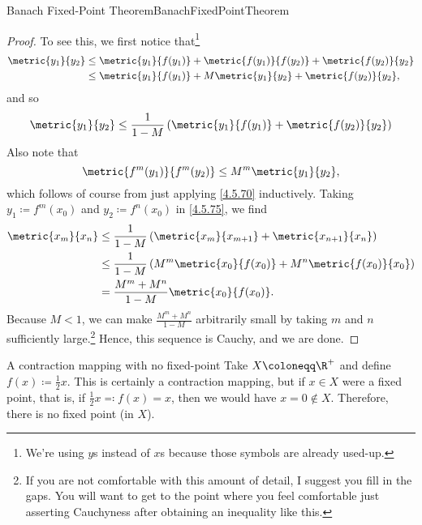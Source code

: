 \begin{thm}{Banach Fixed-Point Theorem}{BanachFixedPointTheorem}
\begin{proof}
To see this, we first notice that\footnote{We're using $y$s instead of $x$s because those symbols are already used-up.}
\begin{equation}
\begin{split}
\metric{y_1}{y_2} & \leq \metric{y_1}{f(y_1)}+\metric{f(y_1)}{f(y_2)}+\metric{f(y_2)}{y_2} \\
& \leq \metric{y_1}{f(y_1)}+M\metric{y_1}{y_2}+\metric{f(y_2)}{y_2},
\end{split}
\end{equation}
and so
\begin{equation}\label{4.5.75}
\metric{y_1}{y_2}\leq \frac{1}{1-M}\left( \metric{y_1}{f(y_1)}+\metric{f(y_2)}{y_2}\right) 
\end{equation}
Also note that
\begin{equation}
\metric{f^m(y_1)}{f^m(y_2)}\leq M^m\metric{y_1}{y_2},
\end{equation}
which follows of course from just applying \eqref{4.5.70} inductively.  Taking $y_1\coloneqq f^m(x_0)$ and $y_2\coloneqq f^n(x_0)$ in \eqref{4.5.75}, we find
\begin{equation}
\begin{split}
\metric{x_m}{x_n} & \leq \frac{1}{1-M}\left( \metric{x_m}{x_{m+1}}+\metric{x_{n+1}}{x_n}\right) \\
& \leq \frac{1}{1-M}\left( M^m\metric{x_0}{f(x_0)}+M^n\metric{f(x_0)}{x_0}\right) \\
& =\frac{M^m+M^n}{1-M}\metric{x_0}{f(x_0)}.
\end{split}
\end{equation}
Because $M<1$, we can make $\frac{M^m+M^n}{1-M}$ arbitrarily small by taking $m$ and $n$ sufficiently large.\footnote{If you are not comfortable with this amount of detail, I suggest you fill in the gaps.  You will want to get to the point where you feel comfortable just asserting Cauchyness after obtaining an inequality like this.}  Hence, this sequence is Cauchy, and we are done.
\end{proof}
\end{thm}
\begin{exm}{A contraction mapping with no fixed-point}{}
Take $X\coloneqq \R ^+$ and define $f(x)\coloneqq \frac{1}{2}x$.  This is certainly a contraction mapping, but if $x\in X$ were a fixed point, that is, if $\frac{1}{2}x\eqqcolon f(x)=x$, then we would have $x=0\notin X$.  Therefore, there is no fixed point (in $X$).
\end{exm}
